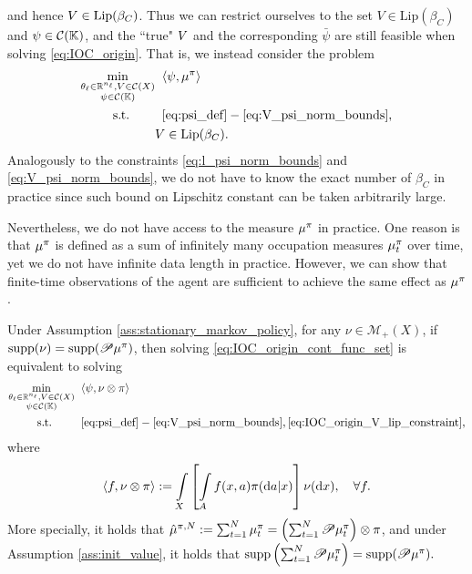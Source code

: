 and hence $\relax{V}\in \text{Lip}(\beta_C)$. 
Thus we can restrict ourselves to the set $V\in \text{Lip}(\beta_C)$ and $\psi\in \mathcal{C}(\mathbb{K})$, and the ``true" $\relax{V}$ and the corresponding $\bar{\psi}$ are still feasible when solving \eqref{eq:IOC_origin}. That is, we instead consider the problem
\begin{subequations}\label{eq:IOC_origin_cont_func_set}
  \begin{align}
    \min_{\substack{\theta_\ell\in\mathbb{R}^{n_\ell}, V\in \mathcal{C}(X)\\\psi\in \mathcal{C}(\mathbb{K})}} &\;\;\langle\psi,\mu^{\relax{\pi}} \rangle\\
    \label{eq:IOC_origin_cont_func_set_obj}
    \operatorname*{s.\hspace{-2pt}t.} \qquad &\;\;\eqref{eq:psi_def}-\eqref{eq:V_psi_norm_bounds},\\
    &V\in \text{Lip}(\beta_C).
    \label{eq:IOC_origin_V_lip_constraint}
  \end{align}
\end{subequations}
Analogously to the constraints \eqref{eq:l_psi_norm_bounds} and \eqref{eq:V_psi_norm_bounds}, we do not have to know the exact number of $\beta_C$ in practice since such bound on Lipschitz constant can be taken arbitrarily large.

Nevertheless, we do not have access to the measure $\mu^{\relax{\pi}}$ in practice. One reason is that $\mu^{\relax{\pi}}$ is defined as a sum of infinitely many occupation measures $\mu_t^{\relax{\pi}}$ over time, yet we do not have infinite data length in practice. However, we can show that finite-time observations of the agent are sufficient to achieve the same effect as $\mu^{\relax{\pi}}$.


\begin{proposition}\label{prop:finite_time_horizon_equivalent}
  Under Assumption \ref{ass:stationary_markov_policy}, for any $\nu\in\mathcal{M}_+(X)$, if $\operatorname*{supp}(\nu) =  \operatorname*{supp}(\mathscr{P}\mu^{\relax{\pi}})$, then solving \eqref{eq:IOC_origin_cont_func_set} is equivalent to solving
  \begin{subequations}\label{eq:IOC_approx1}
  \begin{align}
    \min_{\substack{\theta_\ell\in\mathbb{R}^{n_\ell}, V\in \mathcal{C}(X)\\\psi\in \mathcal{C}(\mathbb{K})}} &\;\;\langle\psi, \nu \otimes\relax{\pi}  \rangle\label{eq:IOC_approx1_obj_func}\\
    \operatorname*{s.\hspace{-2pt}t.} \qquad &\;\;\eqref{eq:psi_def}-\eqref{eq:V_psi_norm_bounds},\eqref{eq:IOC_origin_V_lip_constraint}, \label{eq:IOC_approx1_constraints}
  \end{align}
\end{subequations}
  where 
  \begin{align*}
    \langle f, \nu\otimes\pitrue\rangle := \int_X \left[ \int_A f(x,a)\pitrue(\mathrm{d}a|x) \right]\nu(\mathrm{d}x),\quad \forall f.
  \end{align*}
More specially, it holds that $\hat{\mu}^{\relax{\pi},N}:=\sum_{t=1}^N\mu_t^{\relax{\pi}} = \left(\sum_{t=1}^N\mathscr{P}\mu_t^{\relax{\pi}}\right)\otimes\relax{\pi}$, and under Assumption \ref{ass:init_value}, it holds that $\operatorname*{supp}\left(\sum_{t=1}^N\mathscr{P}\mu_t^{\relax{\pi}}\right)=\operatorname*{supp}( \mathscr{P}\mu^{\relax{\pi}}).$
\end{proposition}

